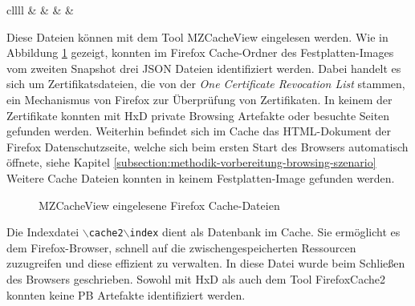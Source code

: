 \begin{appendices}
{\begin{landscape}
\begin{table}[h!]
{\begin{tabular}{cllll}
							  &                                                                           &  &  &                 \\ \hline
						\end{tabular}
					}
				\end{table}
			\end{landscape}
		}
		\restoregeometry
		
		Diese Dateien können mit dem Tool MZCacheView eingelesen werden.
		Wie in Abbildung \ref{img:mzcacheview} gezeigt, konnten im Firefox Cache-Ordner des Festplatten-Images vom zweiten Snapshot drei JSON Dateien identifiziert werden. Dabei handelt es sich um Zertifikatsdateien, die von der \textit{One Certificate Revocation List} stammen, ein Mechanismus von Firefox zur Überprüfung von Zertifikaten. In keinem der Zertifikate konnten mit HxD private Browsing Artefakte oder besuchte Seiten gefunden werden. \cite{TechSupportGuy.05.06.2023}
		Weiterhin befindet sich im Cache das HTML-Dokument der Firefox Datenschutzseite, welche sich beim ersten Start des Browsers automatisch öffnete, siehe Kapitel \ref{subsection:methodik-vorbereitung-browsing-szenario}
		Weitere Cache Dateien konnten in keinem Festplatten-Image gefunden werden.
		\begin{figure}[h!]
			\caption{MZCacheView eingelesene Firefox Cache-Dateien}
			\label{img:mzcacheview}
		\end{figure}
		Die Indexdatei \texttt{$\backslash$cache2$\backslash$index} dient als Datenbank im Cache. Sie ermöglicht es dem Firefox-Browser, schnell auf die zwischengespeicherten Ressourcen zuzugreifen und diese effizient zu verwalten. In diese Datei wurde beim Schließen des Browsers geschrieben. Sowohl mit HxD als auch dem Tool FirefoxCache2 konnten keine PB Artefakte identifiziert werden.
		

\end{appendices}
